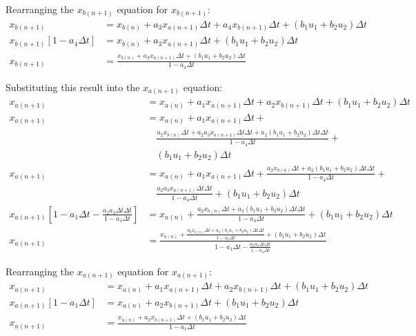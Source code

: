 \documentclass[11pt]{article}
\begin{document}
Rearranging the $x_{b(n+1)}$ equation for $x_{b(n+1)}$:
\begin{subequations}
  \begin{align}
    x_{b(n+1)} &= x_{b(n)} +  a_3 x_{a(n+1)}\Delta t + a_4 x_{b(n+1)}\Delta t + (b_1 u_1 + b_2 u_2)\Delta t \\
    x_{b(n+1)}\left[1 - a_4\Delta t\right] &= x_{b(n)} +  a_3 x_{a(n+1)}\Delta t + (b_1 u_1 + b_2 u_2)\Delta t \\
    x_{b(n+1)} &= \frac{x_{b(n)} +  a_3 x_{a(n+1)}\Delta t + (b_1 u_1 + b_2 u_2)\Delta t}{1 - a_4\Delta t}
  \end{align}
\end{subequations}

Substituting this result into the $x_{a(n+1)}$ equation:
\begin{subequations}
  \begin{align}
    x_{a(n+1)} &= x_{a(n)} +  a_1 x_{a(n+1)}\Delta t + a_2 x_{b(n+1)}\Delta t + (b_1 u_1 + b_2 u_2)\Delta t \\
    x_{a(n+1)} &= x_{a(n)} +  a_1 x_{a(n+1)}\Delta t + \\ \nonumber
    &\quad \frac{a_2 x_{b(n)} \Delta t +  a_2 a_3 x_{a(n+1)}\Delta t\Delta t + a_2(b_1 u_1 + b_2 u_2)\Delta t\Delta t}{1 - a_4\Delta t} + \\ \nonumber
    &\quad (b_1 u_1 + b_2 u_2)\Delta t \\
    x_{a(n+1)} &= x_{a(n)} +  a_1 x_{a(n+1)}\Delta t + \frac{a_2 x_{b(n)} \Delta t + a_2(b_1 u_1 + b_2 u_2)\Delta t\Delta t}{1 - a_4\Delta t} + \\ \nonumber
    &\quad \frac{a_2 a_3 x_{a(n+1)}\Delta t\Delta t}{1 - a_4\Delta t} + (b_1 u_1 + b_2 u_2)\Delta t \\
    x_{a(n+1)}\left[1 - a_1\Delta t - \frac{a_2 a_3 \Delta t\Delta t}{1 - a_4\Delta t}\right] &= x_{a(n)} + \frac{a_2 x_{b(n)} \Delta t + a_2(b_1 u_1 + b_2 u_2)\Delta t\Delta t}{1 - a_4\Delta t} + (b_1 u_1 + b_2 u_2)\Delta t \\
    x_{a(n+1)} &= \frac{x_{a(n)} + \frac{a_2 x_{b(n)} \Delta t + a_2(b_1 u_1 + b_2 u_2)\Delta t\Delta t}{1 - a_4\Delta t} + (b_1 u_1 + b_2 u_2)\Delta t}{1 - a_1\Delta t - \frac{a_2 a_3 \Delta t\Delta t}{1 - a_4\Delta t}}
  \end{align}
\end{subequations}

Rearranging the $x_{a(n+1)}$ equation for $x_{a(n+1)}$:
\begin{subequations}
  \begin{align}
    x_{a(n+1)} &= x_{a(n)} +  a_1 x_{a(n+1)}\Delta t + a_2 x_{b(n+1)}\Delta t + (b_1 u_1 + b_2 u_2)\Delta t \\
    x_{a(n+1)}\left[1 - a_1\Delta t\right] &= x_{a(n)} + a_2 x_{b(n+1)}\Delta t + (b_1 u_1 + b_2 u_2)\Delta t \\
    x_{a(n+1)} &= \frac{x_{a(n)} + a_2 x_{b(n+1)}\Delta t + (b_1 u_1 + b_2 u_2)\Delta t}{1 - a_1\Delta t}
  \end{align}
\end{subequations}
\end{document}
